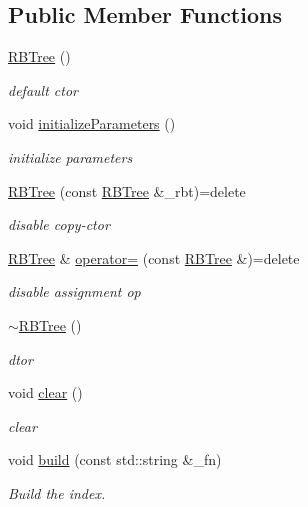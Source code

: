 \subsection*{Public Member Functions}
\begin{DoxyCompactItemize}
\item 
\hyperlink{classRBTree_a0b2a2b29f4c0af9602070efc3cc7b46d}{R\-B\-Tree} ()
\begin{DoxyCompactList}\small\item\em default ctor \end{DoxyCompactList}\item 
void \hyperlink{classRBTree_ae1b9a0c5db76ea343f820daf28b938b3}{initialize\-Parameters} ()
\begin{DoxyCompactList}\small\item\em initialize parameters \end{DoxyCompactList}\item 
\hyperlink{classRBTree_aabacf7b4804dd76d4381346c6c223e8c}{R\-B\-Tree} (const \hyperlink{classRBTree}{R\-B\-Tree} \&\-\_\-rbt)=delete
\begin{DoxyCompactList}\small\item\em disable copy-\/ctor \end{DoxyCompactList}\item 
\hyperlink{classRBTree}{R\-B\-Tree} \& \hyperlink{classRBTree_ae5e228bf0b785798baf431f141c8d151}{operator=} (const \hyperlink{classRBTree}{R\-B\-Tree} \&)=delete
\begin{DoxyCompactList}\small\item\em disable assignment op \end{DoxyCompactList}\item 
\hyperlink{classRBTree_a14ae21c7eb9e3d28ebe513eb8eb72d8a}{$\sim$\-R\-B\-Tree} ()
\begin{DoxyCompactList}\small\item\em dtor \end{DoxyCompactList}\item 
void \hyperlink{classRBTree_afe9b9b73e4c8a4f812a8e71d6e64d0a8}{clear} ()
\begin{DoxyCompactList}\small\item\em clear \end{DoxyCompactList}\item 
void \hyperlink{classRBTree_a151d590aa5192af4d3708ac8727ec0d0}{build} (const std\-::string \&\-\_\-fn)
\begin{DoxyCompactList}\small\item\em Build the index. \end{DoxyCompactList}\item 

\end{DoxyCompactItemize}
